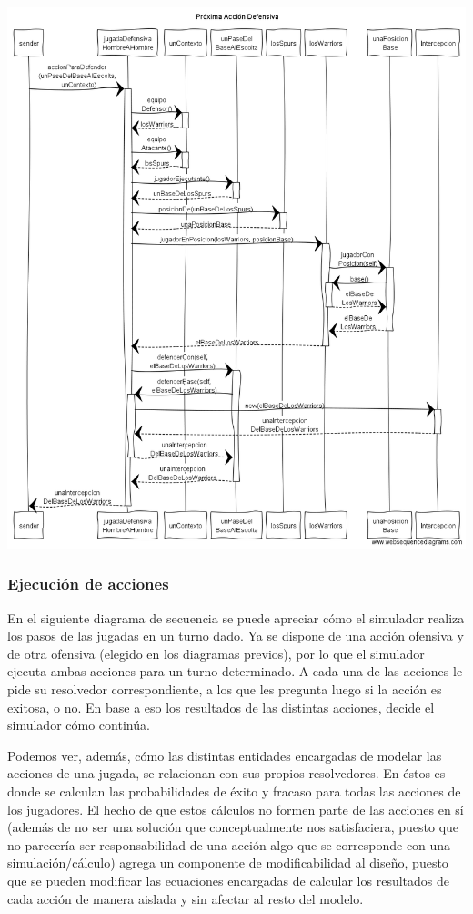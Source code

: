 \begin{center}
\includegraphics[scale=0.4]{diseno/Proxima_accion_defensiva.png}
\end{center}


\subsubsection{Ejecución de acciones}
En el siguiente diagrama de secuencia se puede apreciar cómo el simulador realiza los pasos de las jugadas en un turno dado. Ya se dispone de una acción ofensiva y de otra ofensiva (elegido en los diagramas previos), por lo que el simulador ejecuta ambas acciones para un turno determinado. A cada una de las acciones le pide su resolvedor correspondiente, a los que les pregunta luego si la acción es exitosa, o no. En base a eso los resultados de las distintas acciones, decide el simulador cómo continúa.

Podemos ver, además, cómo las distintas entidades encargadas de modelar las acciones de una jugada, se relacionan con sus propios resolvedores. En éstos es donde se calculan las probabilidades de éxito y fracaso para todas las acciones de los jugadores. El hecho de que estos cálculos no formen parte de las acciones en sí (además de no ser una solución que conceptualmente nos satisfaciera, puesto que no parecería ser responsabilidad de una acción algo que se corresponde con una simulación/cálculo) agrega un componente de modificabilidad al diseño, puesto que se pueden modificar las ecuaciones encargadas de calcular los resultados de cada acción de manera aislada y sin afectar al resto del modelo.

